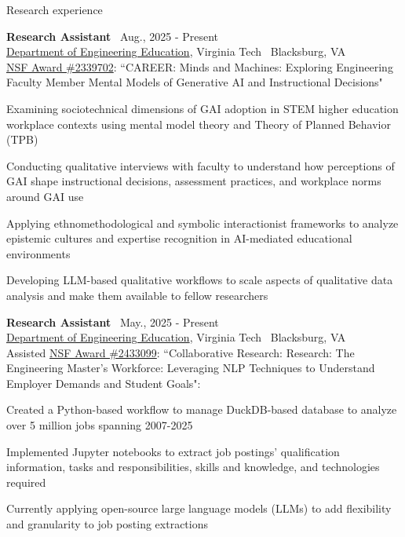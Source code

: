 \documentclass{resume}
\begin{document}
\begin{rSection}{Research experience}

{\bf Research Assistant} \hfill {\ Aug., 2025 - Present }\\ 
{\href{https://enge.vt.edu/}{Department of Engineering Education}, Virginia Tech} \hfill {\ {Blacksburg, VA}}\\
\href{https://www.nsf.gov/awardsearch/showAward?AWD_ID=2339702&HistoricalAwards=false}{NSF Award \#2339702}: ``CAREER: Minds and Machines: Exploring Engineering Faculty Member Mental Models of Generative AI and Instructional Decisions"
\begin{cvitems}
    \item Examining sociotechnical dimensions of GAI adoption in STEM higher education workplace contexts using mental model theory and Theory of Planned Behavior (TPB)
    \item Conducting qualitative interviews with faculty to understand how perceptions of GAI shape instructional decisions, assessment practices, and workplace norms around GAI use
    \item Applying ethnomethodological and symbolic interactionist frameworks to analyze epistemic cultures and expertise recognition in AI-mediated educational environments
    \item Developing LLM-based qualitative workflows to scale aspects of qualitative data analysis and make them available to fellow researchers
\end{cvitems}

{\bf Research Assistant} \hfill {\ May., 2025 - Present }\\ 
{\href{https://enge.vt.edu/}{Department of Engineering Education}, Virginia Tech} \hfill {\ {Blacksburg, VA}}\\
Assisted \href{https://www.nsf.gov/awardsearch/showAward?AWD_ID=2433099&HistoricalAwards=false}{NSF Award \#2433099}: ``Collaborative Research: Research: The Engineering Master's Workforce: Leveraging NLP Techniques to Understand Employer Demands and Student Goals":
\begin{cvitems}
    \item Created a Python-based workflow to manage DuckDB-based database to analyze over 5 million jobs spanning 2007-2025 
    \item Implemented Jupyter notebooks to extract job postings' qualification information, tasks and responsibilities, skills and knowledge, and technologies required
    \item Currently applying open-source large language models (LLMs) to add flexibility and granularity to job posting extractions
\end{cvitems}


\end{rSection}
\end{document}
